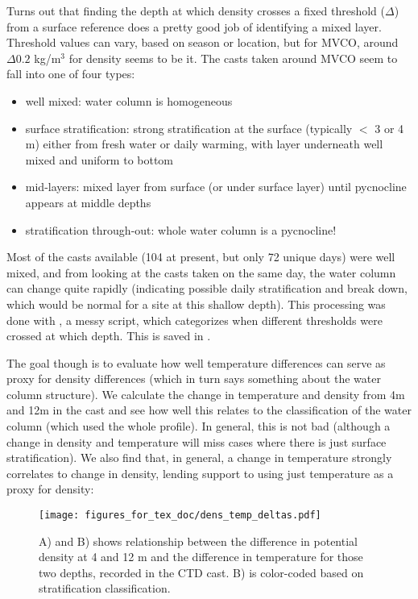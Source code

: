\documentclass[11pt]{article}
\begin{document}
Turns out that finding the depth at which density crosses a fixed threshold ($\Delta$) from a surface reference does a pretty good job of identifying a mixed layer. Threshold values can vary, based on season or location, but for MVCO, around $\Delta0.2$ kg/m$^3$ for density seems to be it. The casts taken around MVCO seem to fall into one of four types:

\begin{itemize}

\item well mixed: water column is homogeneous
\item surface stratification: strong stratification at the surface (typically $<$ 3 or 4 m) either from fresh water or daily warming, with layer underneath well mixed and uniform to bottom
\item mid-layers: mixed layer from surface (or under surface layer) until pycnocline appears at middle depths 
\item stratification through-out: whole water column is a pycnocline!
\end{itemize}

Most of the casts available (104 at present, but only 72 unique days) were well mixed, and from looking at the casts taken on the same day, the water column can change quite rapidly (indicating possible daily stratification and break down, which would be normal for a site at this shallow depth). This processing was done with , a messy script, which categorizes when different thresholds were crossed at which depth. This is saved in .

 The goal though is to evaluate how well temperature differences can serve as proxy for density differences (which in turn says something about the water column structure). We calculate the change in temperature and density from 4m and 12m in the cast and see how well this relates to the classification of the water column (which used the whole profile). In general, this is not bad (although a change in density and temperature will miss cases where there is just surface stratification). We also find that, in general, a change in temperature strongly correlates to change in density, lending support to using just temperature as a proxy for density:

 \begin{figure}[h]
\centering
\texttt{[image: figures\_for\_tex\_doc/dens\_temp\_deltas.pdf]}
\caption{A) and B) shows relationship between the difference in potential density at 4 and 12 m and the difference in temperature for those two depths, recorded in the CTD cast. B) is color-coded based on stratification classification.}
\end{figure}
\end{document}
